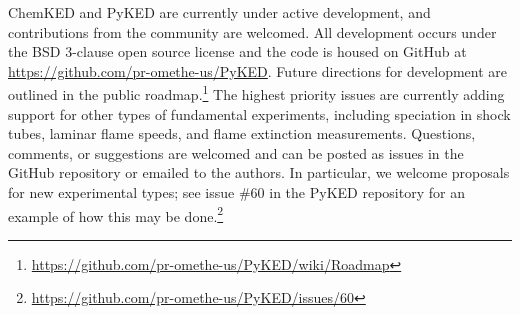 \documentclass[12pt]{ijck}
\newcommand\ck{ChemKED}
\newcommand\pk{PyKED}
\begin{document}
\ck{} and \pk{} are currently under active development, and contributions from
the community are welcomed. All development occurs under the BSD 3-clause open source
license and the code is housed on GitHub at
\url{https://github.com/pr-omethe-us/PyKED}. Future directions for development
are outlined in the public
roadmap.\footnote{\url{https://github.com/pr-omethe-us/PyKED/wiki/Roadmap}}
The highest priority issues are currently adding support for other types of
fundamental experiments, including speciation in shock tubes, laminar flame speeds,
and flame extinction measurements.
Questions, comments, or suggestions are welcomed and can be posted as issues in the
GitHub repository or emailed to the authors. In particular, we welcome proposals for new
experimental types; see issue \#60 in the \pk{} repository for an example of how this may
be done.\footnote{\url{https://github.com/pr-omethe-us/PyKED/issues/60}}

\printbibliography
\end{document}
